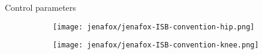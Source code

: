 \begin{frame}{Control parameters~\cite{Jenafox:ISB}}%
    \begin{figure}[H]%
        \centering%
        \begin{subfigure}{0.5\linewidth}%
            \texttt{[image: jenafox/jenafox-ISB-convention-hip.png]}
        \end{subfigure}%
        \hfil%
        \begin{subfigure}{0.5\linewidth}%
            \texttt{[image: jenafox/jenafox-ISB-convention-knee.png]}
        \end{subfigure}%
    \end{figure}%
\end{frame}%
%